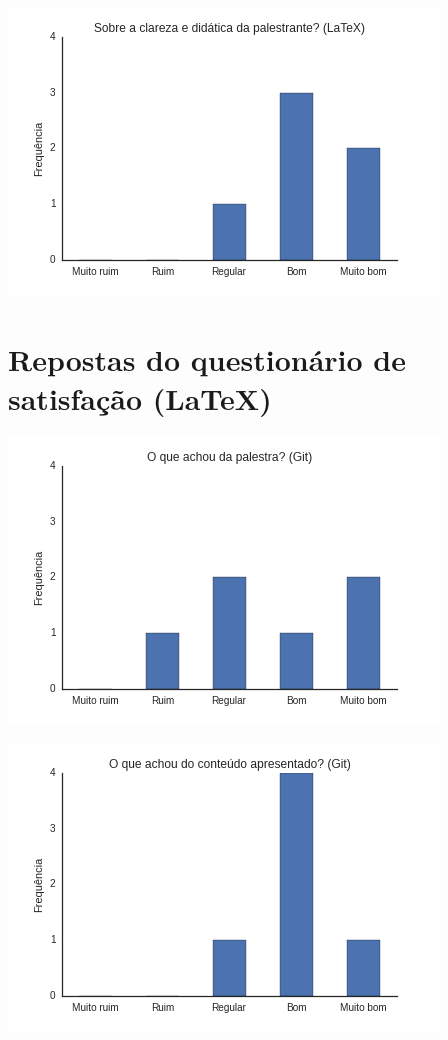 \documentclass[12pt]{article}
\begin{document}
\begin{center}
    \includegraphics[height=0.25\textheight]{images/latex3.png}
\end{center}

\section*{Repostas do questionário de satisfação (LaTeX)}

\begin{center}
    \includegraphics[height=0.25\textheight]{images/git1.png}
\end{center}

\begin{center}
    \includegraphics[height=0.25\textheight]{images/git2.png}
\end{center}
\end{document}
